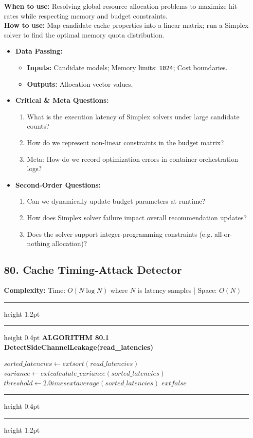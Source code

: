 \documentclass[11pt,a4paper]{article}
\newenvironment{textbookalgo}[2]{%
  \par\addvspace{1.2em}\noindent
  \hrule height 1.2pt
  \vspace{1.5pt}
  \hrule height 0.4pt
  \vspace{5pt}
  {\noindent\large\bfseries\sffamily ALGORITHM #1 \quad #2}
  \par\vspace{5pt}
  \RestyleAlgo{plain}
}{%
  \par\vspace{4pt}
  \hrule height 0.4pt
  \vspace{1.5pt}
  \hrule height 1.2pt
  \par\addvspace{1.2em}
}
\theoremstyle{definition}
\begin{document}
\noindent
\textbf{When to use:} Resolving global resource allocation problems to maximize hit rates while respecting memory and budget constraints.\\
\textbf{How to use:} Map candidate cache properties into a linear matrix; run a Simplex solver to find the optimal memory quota distribution.
\begin{itemize}[leftmargin=*]
  \item[] \textbf{Data Passing:}
    \begin{itemize}
      \item \textbf{Inputs:} Candidate models; Memory limits: \texttt{1024}; Cost boundaries.
      \item \textbf{Outputs:} Allocation vector values.
    \end{itemize}
  \item[] \textbf{Critical \& Meta Questions:}
  \begin{enumerate}
    \item What is the execution latency of Simplex solvers under large candidate counts?
    \item How do we represent non-linear constraints in the budget matrix?
    \item Meta: How do we record optimization errors in container orchestration logs?
  \end{enumerate}
  \item[] \textbf{Second-Order Questions:}
  \begin{enumerate}
    \item Can we dynamically update budget parameters at runtime?
    \item How does Simplex solver failure impact overall recommendation updates?
    \item Does the solver support integer-programming constraints (e.g. all-or-nothing allocation)?
  \end{enumerate}
\end{itemize}
\medskip

\clearpage
\subsection{80. Cache Timing-Attack Detector}


\noindent
\textbf{Complexity:} Time: $O(N \log N)$ where $N$ is latency samples | Space: $O(N)$
\smallskip

\begin{textbookalgo}{80.1}{DetectSideChannelLeakage(read\_latencies)}
\begin{algorithm}[H]
$sorted\_latencies \leftarrow 	ext{sort}(read\_latencies)$\;
$variance \leftarrow 	ext{calculate\_variance}(sorted\_latencies)$\;
$threshold \leftarrow 2.0 	imes 	ext{average}(sorted\_latencies)$\;
\Return $	ext{false}$\;
\end{algorithm}
\end{textbookalgo}
\end{document}
